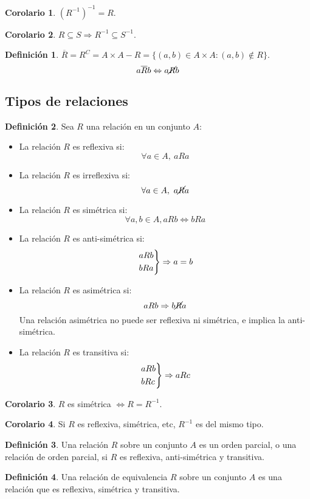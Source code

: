 \documentclass[10pt]{article}
\theoremstyle{definition}
\newtheorem{definition}{Definición}[section]
\newtheorem{corollary}{Corolario}[theorem]
\begin{document}
\begin{corollary}
	$(R^{-1})^{-1}=R$.
\end{corollary}
\begin{corollary}
	$R\subseteq S\Rightarrow R^{-1}\subseteq S^{-1}$.
\end{corollary}
\begin{definition}
	$\overline{R}=R^C=A\times A-R=\{(a,b)\in A\times A: (a,b)\notin R\}$.\\
	$$a\overline{R}b\Leftrightarrow a\cancel{R}b$$
\end{definition}
\newpage\subsection{Tipos de relaciones}
\begin{definition}
	Sea $R$ una relación en un conjunto $A$:
	\begin{itemize}
		\item La relación $R$ es reflexiva si: $$\forall a\in A,\ aRa$$
		\item La relación $R$ es irreflexiva si: $$\forall a\in A,\ a\cancel{R}a$$
		\item La relación $R$ es simétrica si: $$\forall a,b\in A, aRb\Leftrightarrow bRa$$
		\item La relación $R$ es anti-simétrica si: $$\begin{rcases}aRb\\bRa\end{rcases}\Rightarrow a=b$$
		\item La relación $R$ es asimétrica si: $$aRb\Rightarrow b\cancel{R}a$$
		      Una relación asimétrica no puede ser reflexiva ni simétrica, e implica la anti-simétrica.
		\item La relación $R$ es transitiva si: $$\begin{rcases}aRb\\bRc\end{rcases}\Rightarrow aRc$$
	\end{itemize}
\end{definition}
\begin{corollary}
	$R$ es simétrica $\Leftrightarrow R=R^{-1}$.
\end{corollary}
\begin{corollary}
	Si $R$ es reflexiva, simétrica, etc, $R^{-1}$ es del mismo tipo.
\end{corollary}
\begin{definition}
	Una relación $R$ sobre un conjunto $A$ es un orden parcial, o una relación de orden parcial, si $R$ es reflexiva, anti-simétrica y transitiva.
\end{definition}
\begin{definition}
	Una relación de equivalencia $R$ sobre un conjunto $A$ es una relación que es reflexiva, simétrica y transitiva.
\end{definition}
\end{document}
